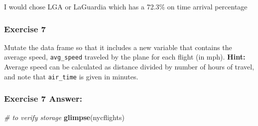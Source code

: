 \documentclass[
]{article}
\newenvironment{Shaded}{\begin{snugshade}}{\end{snugshade}}
\newcommand{\CommentTok}[1]{\textcolor[rgb]{0.56,0.35,0.01}{\textit{#1}}}
\newcommand{\DataTypeTok}[1]{\textcolor[rgb]{0.13,0.29,0.53}{#1}}
\newcommand{\DecValTok}[1]{\textcolor[rgb]{0.00,0.00,0.81}{#1}}
\newcommand{\KeywordTok}[1]{\textcolor[rgb]{0.13,0.29,0.53}{\textbf{#1}}}
\newcommand{\NormalTok}[1]{#1}
\newcommand{\OperatorTok}[1]{\textcolor[rgb]{0.81,0.36,0.00}{\textbf{#1}}}
\newcommand{\StringTok}[1]{\textcolor[rgb]{0.31,0.60,0.02}{#1}}
\begin{document}
I would chose LGA or LaGuardia which has a 72.3\% on time arrival
percentage

\hypertarget{exercise-7}{%
\subsubsection{Exercise 7}\label{exercise-7}}

Mutate the data frame so that it includes a new variable that contains
the average speed, \texttt{avg\_speed} traveled by the plane for each
flight (in mph). \textbf{Hint:} Average speed can be calculated as
distance divided by number of hours of travel, and note that
\texttt{air\_time} is given in minutes.

\hypertarget{exercise-7-answer}{%
\subsubsection{\texorpdfstring{\textbf{Exercise 7
Answer:}}{Exercise 7 Answer:}}\label{exercise-7-answer}}

\begin{Shaded}
\end{Shaded}

\begin{Shaded}
\end{Shaded}

\begin{Shaded}
\begin{Highlighting}[]
\CommentTok{# to verify storage}
\KeywordTok{glimpse}\NormalTok{(nycflights)}
\end{Highlighting}
\end{Shaded}
\end{document}
